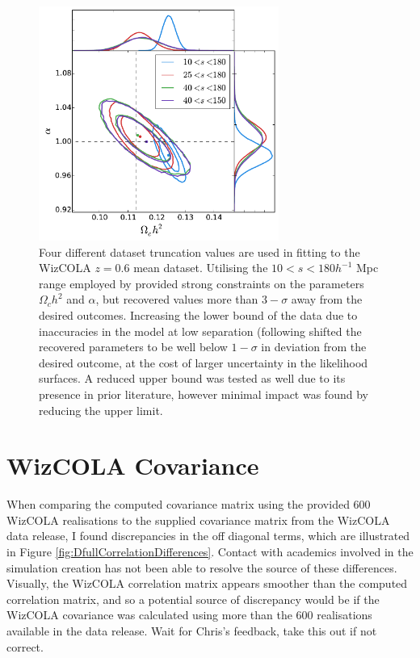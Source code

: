 \documentclass[titlesmallcaps, examinerscopy, copyrightpage]{uqthesis}
\newcommand{\red}{\color{red}}
\begin{document}
\begin{appendices}
\begin{figure}[h!]
  \begin{center}
    \includegraphics[width=0.7\textwidth]{images/CdatasetTrunc.pdf}
  \end{center}
  \caption{Four different dataset truncation values are used in fitting to the WizCOLA $z=0.6$ mean dataset. Utilising the $10<s<180 h^{-1}$ Mpc range employed by \citet{BlakeDavis2011} provided strong constraints on the parameters $\Omega_c h^2$ and $\alpha$, but recovered values more than $3-\sigma$ away from the desired outcomes. Increasing the lower bound of the data due to inaccuracies in the model at low separation (following \citet{ChuangWang2012} shifted the recovered parameters to be well below $1-\sigma$ in deviation from the desired outcome, at the cost of larger uncertainty in the likelihood surfaces. A reduced upper bound was tested as well due to its presence in prior literature, however minimal impact was found by reducing the upper limit.}
  \label{fig:CdatasetTrunc}
\end{figure}



\chapter{WizCOLA Covariance} \label{app:wizDiff}


When comparing the computed covariance matrix using the provided 600 WizCOLA realisations to the supplied covariance matrix from the WizCOLA data release, I found discrepancies in the off diagonal terms, which are illustrated in Figure \ref{fig:DfullCorrelationDifferences}. Contact with academics involved in the simulation creation has not been able to resolve the source of these differences. Visually, the WizCOLA correlation matrix appears smoother than the computed correlation matrix, and so a potential source of discrepancy would be if the WizCOLA covariance was calculated using more than the 600 realisations available in the data release. {\red Wait for Chris's feedback, take this out if not correct}.


\end{appendices}
\end{document}
